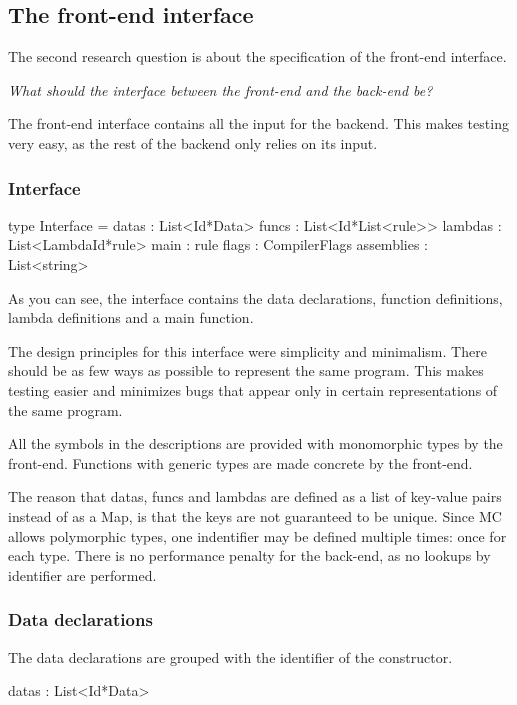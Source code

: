 \subsection{The front-end interface}
The second research question is about the specification of the front-end interface.

\textit{What should the interface between the front-end and the back-end be?}

The front-end interface contains all the input for the backend.
This makes testing very easy, as the rest of the backend only relies on its input.

\subsubsection{Interface}

\begin{code}
type Interface = {
  datas      : List<Id*Data>
  funcs      : List<Id*List<rule>>
  lambdas    : List<LambdaId*rule>
  main       : rule
  flags      : CompilerFlags
  assemblies : List<string> 
}
\end{code}

As you can see, the interface contains the data declarations, function definitions, lambda definitions and a main function.

The design principles for this interface were simplicity and minimalism.
There should be as few ways as possible to represent the same program.
This makes testing easier and minimizes bugs that appear only in certain representations of the same program.

All the symbols in the descriptions are provided with monomorphic types by the front-end.
Functions with generic types are made concrete by the front-end.

The reason that datas, funcs and lambdas are defined as a list of key-value pairs instead of as a Map, is that the keys are not guaranteed to be unique.
Since MC allows polymorphic types, one indentifier may be defined multiple times: once for each type.
There is no performance penalty for the back-end, as no lookups by identifier are performed.

\subsubsection{Data declarations}
The data declarations are grouped with the identifier of the constructor.

\begin{code}
datas : List<Id*Data>
\end{code}

